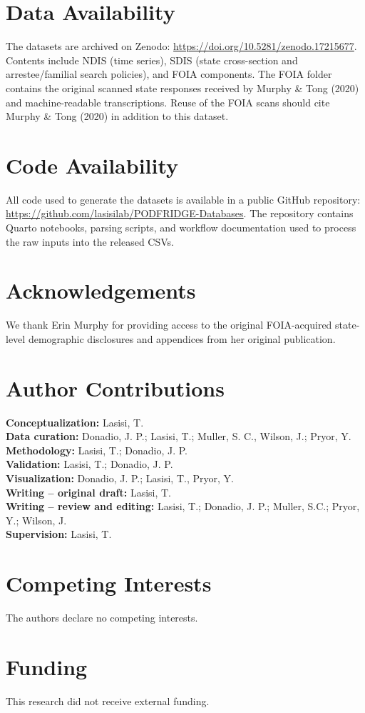 \documentclass{article}
\begin{document}
\clearpage

\section*{Data Availability}

The datasets are archived on Zenodo: \url{https://doi.org/10.5281/zenodo.17215677}. Contents include NDIS (time series), SDIS (state cross-section and arrestee/familial search policies), and FOIA components. The FOIA folder contains the original scanned state responses received by Murphy \& Tong (2020) and machine-readable transcriptions. Reuse of the FOIA scans should cite Murphy \& Tong (2020) \cite{Murphy2020-pc} in addition to this dataset.

\section*{Code Availability}

All code used to generate the datasets is available in a public GitHub repository: \url{https://github.com/lasisilab/PODFRIDGE-Databases}. The repository contains Quarto notebooks, parsing scripts, and workflow documentation used to process the raw inputs into the released CSVs.

\section*{Acknowledgements}

We thank Erin Murphy for providing access to the original FOIA-acquired state-level demographic disclosures and appendices from her original publication.

\section*{Author Contributions}

\textbf{Conceptualization:} Lasisi, T. \\
\textbf{Data curation:} Donadio, J. P.; Lasisi, T.; Muller, S. C., Wilson, J.; Pryor, Y. \\
\textbf{Methodology:} Lasisi, T.; Donadio, J. P. \\
\textbf{Validation:} Lasisi, T.; Donadio, J. P. \\
\textbf{Visualization:} Donadio, J. P.; Lasisi, T., Pryor, Y. \\
\textbf{Writing -- original draft:} Lasisi, T. \\
\textbf{Writing -- review and editing:} Lasisi, T.; Donadio, J. P.; Muller, S.C.; Pryor, Y.; Wilson, J. \\
\textbf{Supervision:} Lasisi, T.

\section*{Competing Interests}

The authors declare no competing interests.

\section*{Funding}
This research did not receive external funding.



\end{document}
